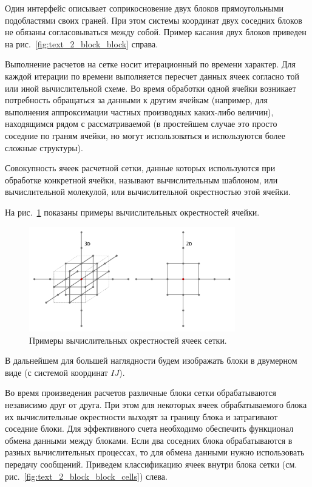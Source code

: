Один интерфейс описывает соприкосновение двух блоков прямоугольными подобластями своих граней.
При этом системы координат двух соседних блоков не обязаны согласовываться между собой.
Пример касания двух блоков приведен на рис.~\ref{fig:text_2_block_block} справа.

Выполнение расчетов на сетке носит итерационный по времени характер.
Для каждой итерации по времени выполняется пересчет данных ячеек согласно той или иной вычислительной схеме.
Во время обработки одной ячейки возникает потребность обращаться за данными к другим ячейкам (например, для выполнения аппроксимации частных производных каких-либо величин), находящимся рядом с рассматриваемой (в простейшем случае это просто соседние по граням ячейки, но могут использоваться и используются более сложные структуры).

\begin{definition}
Совокупность ячеек расчетной сетки, данные которых используются при обработке конкретной ячейки, называют вычислительным шаблоном, или вычислительной молекулой, или вычислительной окрестностью этой ячейки.
\end{definition}

На рис.~\ref{fig:text_2_block_cell_delta} показаны примеры вычислительных окрестностей ячейки.

\begin{figure}[ht]
\centering
\includegraphics[width=0.8\textwidth]{fig/par_3-cell-delta.pdf}
\singlespacing
{}\caption{Примеры вычислительных окрестностей ячеек сетки.}
\label{fig:text_2_block_cell_delta}
\end{figure}

В дальнейшем для большей наглядности будем изображать блоки в двумерном виде (с системой координат $IJ$).

Во время произведения расчетов различные блоки сетки обрабатываются независимо друг от друга.
При этом для некоторых ячеек обрабатываемого блока их вычислительные окрестности выходят за границу блока и затрагивают соседние блоки.
Для эффективного счета необходимо обеспечить функционал обмена данными между блоками.
Если два соседних блока обрабатываются в разных вычислительных процессах, то для обмена данными нужно использовать передачу сообщений.
Приведем классификацию ячеек внутри блока сетки (см. рис.~\ref{fig:text_2_block_block_cells}) слева.


